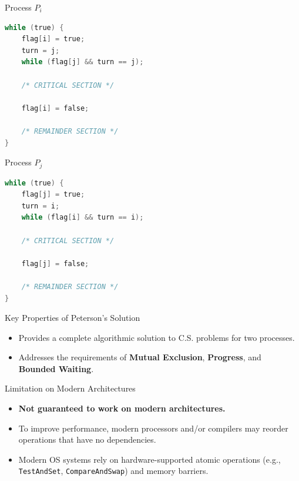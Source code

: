 \documentclass[10pt,a4paper]{article}
\begin{document}
\noindent
\begin{minipage}[t]{0.48\textwidth}
\begin{conceptcard}{Process $P_i$}
\begin{lstlisting}[language=C]
while (true) {
    flag[i] = true;
    turn = j;
    while (flag[j] && turn == j);
    
    /* CRITICAL SECTION */
    
    flag[i] = false;
    
    /* REMAINDER SECTION */
}
\end{lstlisting}
\end{conceptcard}
\end{minipage}
\hfill
\begin{minipage}[t]{0.48\textwidth}
\begin{conceptcard}{Process $P_j$}
\begin{lstlisting}[language=C]
while (true) {
    flag[j] = true;
    turn = i;
    while (flag[i] && turn == i);
    
    /* CRITICAL SECTION */
    
    flag[j] = false;
    
    /* REMAINDER SECTION */
}
\end{lstlisting}
\end{conceptcard}
\end{minipage}

\vspace{0.4em}
\begin{conceptcard}{Key Properties of Peterson's Solution}
\begin{itemize}
    \item Provides a complete algorithmic solution to C.S. problems for two processes.
    \item Addresses the requirements of \textbf{Mutual Exclusion}, \textbf{Progress}, and \textbf{Bounded Waiting}.
\end{itemize}
\end{conceptcard}

\begin{alertbox}{Limitation on Modern Architectures}
\begin{itemize}
    \item \textbf{Not guaranteed to work on modern architectures.}
    \item To improve performance, modern processors and/or compilers may reorder operations that have no dependencies.
    \item Modern OS systems rely on hardware-supported atomic operations (e.g., \texttt{TestAndSet}, \texttt{CompareAndSwap}) and memory barriers.
\end{itemize}
\end{alertbox}
\end{document}
